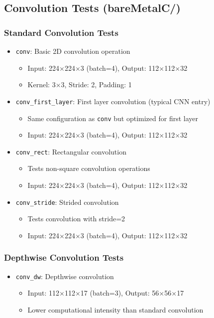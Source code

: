 \subsection{Convolution Tests (bareMetalC/)}

\subsubsection{Standard Convolution Tests}
\begin{itemize}
\item \texttt{conv}: Basic 2D convolution operation
  \begin{itemize}
  \item Input: 224$\times$224$\times$3 (batch=4), Output: 112$\times$112$\times$32
  \item Kernel: 3$\times$3, Stride: 2, Padding: 1
  \end{itemize}

\item \texttt{conv\_first\_layer}: First layer convolution (typical CNN entry)
  \begin{itemize}
  \item Same configuration as \texttt{conv} but optimized for first layer
  \item Input: 224$\times$224$\times$3 (batch=4), Output: 112$\times$112$\times$32
  \end{itemize}

\item \texttt{conv\_rect}: Rectangular convolution
  \begin{itemize}
  \item Tests non-square convolution operations
  \item Input: 224$\times$224$\times$3 (batch=4), Output: 112$\times$112$\times$32
  \end{itemize}

\item \texttt{conv\_stride}: Strided convolution
  \begin{itemize}
  \item Tests convolution with stride=2
  \item Input: 224$\times$224$\times$3 (batch=4), Output: 112$\times$112$\times$32
  \end{itemize}
\end{itemize}

\subsubsection{Depthwise Convolution Tests}
\begin{itemize}
\item \texttt{conv\_dw}: Depthwise convolution
  \begin{itemize}
  \item Input: 112$\times$112$\times$17 (batch=3), Output: 56$\times$56$\times$17
  \item Lower computational intensity than standard convolution
  \end{itemize}
\end{itemize}

